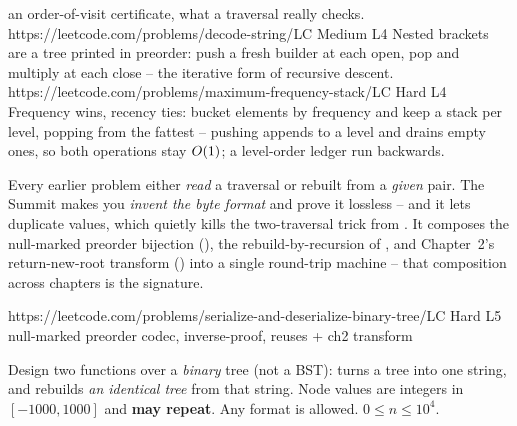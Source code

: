\begin{mixedset}
{    an order-of-visit certificate, what a traversal really checks.}
    {https://leetcode.com/problems/decode-string/}{LC Medium L4}
    {Nested brackets are a tree printed in preorder: push a fresh builder at each
    open, pop and multiply at each close -- the iterative form of recursive descent.}
    {https://leetcode.com/problems/maximum-frequency-stack/}{LC Hard L4}
    {Frequency wins, recency ties: bucket elements by frequency and keep a stack per
    level, popping from the fattest -- pushing appends to a level and drains empty
    ones, so both operations stay $O(1)$; a level-order ledger run backwards.}
\end{mixedset}



\begin{notebox}
Every earlier problem either \emph{read} a traversal or rebuilt from a \emph{given}
pair. The Summit makes you \emph{invent the byte format} and prove it lossless -- and it
lets duplicate values, which quietly kills the two-traversal trick from .
It composes the null-marked preorder bijection (), the
rebuild-by-recursion of , and Chapter~2's return-new-root
transform () into a single round-trip machine -- that
composition across chapters is the  signature.
\end{notebox}

  {https://leetcode.com/problems/serialize-and-deserialize-binary-tree/}{LC Hard L5}
  {null-marked preorder codec, inverse-proof, reuses  + ch2 transform}

\begin{problemstatement}
Design two functions over a \emph{binary} tree (not a BST):  turns a tree
into one string, and  rebuilds \emph{an identical tree} from that
string. Node values are integers in $[-1000,1000]$ and \textbf{may repeat}. Any format is
allowed. $0 \le n \le 10^{4}$.
\end{problemstatement}

